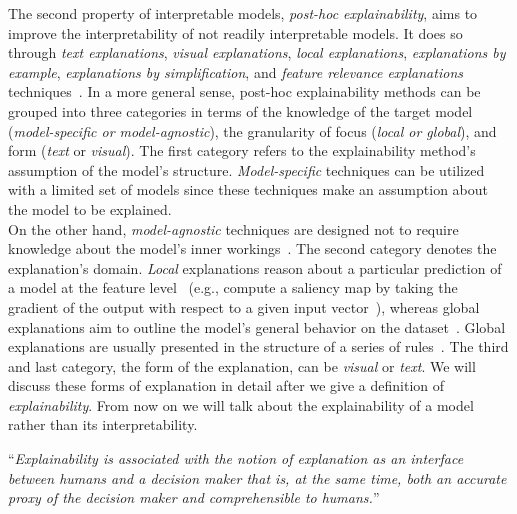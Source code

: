 The second property of interpretable models, \emph{post-hoc explainability}, aims to improve the interpretability of not readily interpretable models. It does so through \emph{text explanations}, \emph{visual explanations}, \emph{local explanations}, \emph{explanations by example}, \emph{explanations by simplification}, and \emph{feature relevance explanations} techniques~\parencite{TheMythosOfModelInterpretability_Lipton, XAIConceptsTaxonomies_Arrieta}. In a more general sense, post-hoc explainability methods can be grouped into three categories in terms of the knowledge of the target model (\emph{model-specific or model-agnostic}), the granularity of focus (\emph{local or global}), and form (\emph{text} or \emph{visual}). The first category refers to the explainability method's assumption of the model's structure. \emph{Model-specific} techniques can be utilized with a limited set of models since these techniques make an assumption about the model to be explained.\\
On the other hand, \emph{model-agnostic} techniques are designed not to require knowledge about the model's inner workings~\parencite{XAIConceptsTaxonomies_Arrieta, ASurveyOfMethodsForExplainingBlackBoxModels_Guidotti}. The second category denotes the explanation's domain. \emph{Local} explanations reason about a particular prediction of a model at the feature level~\parencite{TowardsARigorousScienceML_Velez} (e.g., compute a saliency map by taking the gradient of the output with respect to a given input vector~\parencite{TheMythosOfModelInterpretability_Lipton}), whereas global explanations aim to outline the model's general behavior on the dataset~\parencite{XAIConceptsTaxonomies_Arrieta, ASurveyOfMethodsForExplainingBlackBoxModels_Guidotti,TowardsARigorousScienceML_Velez}. Global explanations are usually presented in the structure of a series of rules~\parencite{InterpretableDecisionSets_Lakkaraju}. The third and last category, the form of the explanation, can be \emph{visual} or \emph{text}. We will discuss these forms of explanation in detail after we give a definition of \emph{explainability}. From now on we will talk about the explainability of a model rather than its interpretability.
\begin{definition}[Explainability]
    “\emph{Explainability is associated with the notion of explanation as an interface between humans and a decision maker that is, at the same time, both an accurate proxy of the decision maker and comprehensible to humans.}”~\parencite{XAIConceptsTaxonomies_Arrieta, ASurveyOfMethodsForExplainingBlackBoxModels_Guidotti}
\end{definition}
